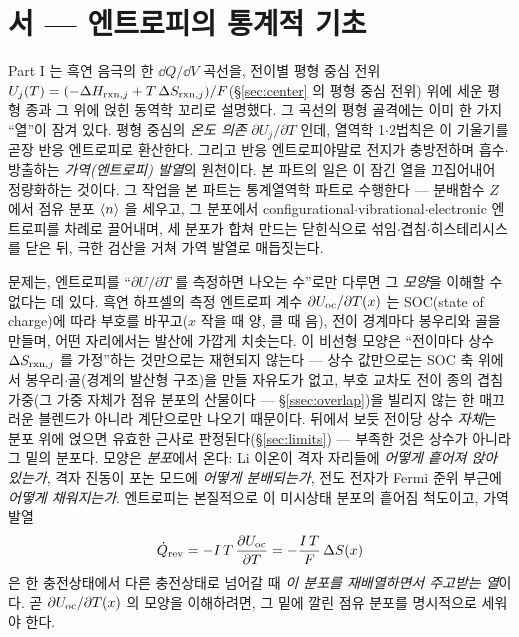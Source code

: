\section*{서 --- 엔트로피의 통계적 기초}

Part I 는 흑연 음극의 한 $\dd Q/\dd V$ 곡선을, 전이별 평형 중심 전위
$U_j(T)=(-\Delta H_{\mathrm{rxn},j}+T\,\Delta S_{\mathrm{rxn},j})/F$(\S\ref{sec:center} 의 평형 중심 전위) 위에 세운 평형 종과 그 위에
얹힌 동역학 꼬리로 설명했다. 그 곡선의 평형 골격에는 이미 한 가지 ``열''이 잠겨 있다. 평형 중심의
\emph{온도 의존} $\partial U_j/\partial T$ 인데, 열역학 1$\cdot$2법칙은 이 기울기를 곧장 반응 엔트로피로 환산한다.
그리고 반응 엔트로피야말로 전지가 충방전하며 흡수$\cdot$방출하는 \emph{가역(엔트로피) 발열}의 원천이다.
본 파트의 일은 이 잠긴 열을 끄집어내어 정량화하는 것이다. 그 작업을 본 파트는 통계열역학 파트로 수행한다 ---
분배함수 $Z$ 에서 점유 분포 $\langle n\rangle$ 을 세우고, 그 분포에서 configurational$\cdot$vibrational$\cdot$electronic
엔트로피를 차례로 끌어내며, 세 분포가 합쳐 만드는 닫힌식으로 섞임$\cdot$겹침$\cdot$히스테리시스를 닫은 뒤,
극한 검산을 거쳐 가역 발열로 매듭짓는다.

문제는, 엔트로피를 ``$\partial U/\partial T$ 를 측정하면 나오는 수''로만 다루면 그 \emph{모양}을 이해할 수
없다는 데 있다. 흑연 하프셀의 측정 엔트로피 계수 $\partial U_{\mathrm{oc}}/\partial T(x)$ 는 SOC(state of charge)에 따라
부호를 바꾸고($x$ 작을 때 양, 클 때 음), 전이 경계마다 봉우리와 골을 만들며, 어떤 자리에서는 발산에 가깝게
치솟는다. 이 비선형 모양은 ``전이마다 상수 $\Delta S_{\mathrm{rxn},j}$ 를 가정''하는 것만으로는 재현되지
않는다 --- 상수 값만으로는 SOC 축 위에서 봉우리$\cdot$골(경계의 발산형 구조)을 만들 자유도가 없고,
부호 교차도 전이 종의 겹침 가중(그 가중 자체가 점유 분포의 산물이다 --- \S\ref{ssec:overlap})을 빌리지
않는 한 매끄러운 블렌드가 아니라 계단으로만 나오기 때문이다. 뒤에서 보듯 전이당 상수 \emph{자체}는 분포
위에 얹으면 유효한 근사로 판정된다(\S\ref{sec:limits}) --- 부족한 것은 상수가 아니라 그 밑의 분포다.
모양은 \emph{분포}에서 온다: Li 이온이 격자 자리들에 \emph{어떻게 흩어져 앉아 있는가}, 격자 진동이 포논
모드에 \emph{어떻게 분배되는가}, 전도 전자가 Fermi 준위 부근에 \emph{어떻게 채워지는가}. 엔트로피는 본질적으로
이 미시상태 분포의 흩어짐 척도이고, 가역 발열
\[
\dot Q_{\mathrm{rev}}=-I\,T\,\frac{\partial U_{\mathrm{oc}}}{\partial T}=-\frac{I\,T}{F}\,\Delta S(x)
\]
은 한 충전상태에서 다른 충전상태로 넘어갈 때 \emph{이 분포를 재배열하면서 주고받는 열}이다. 곧
$\partial U_{\mathrm{oc}}/\partial T(x)$ 의 모양을 이해하려면, 그 밑에 깔린 점유 분포를 명시적으로 세워야 한다.

